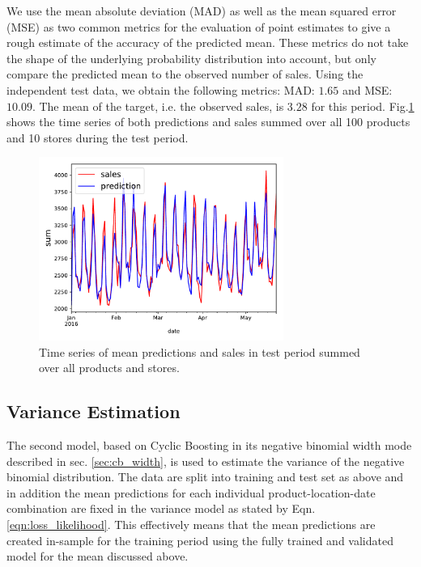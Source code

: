\documentclass[BCOR=1mm, DIV=calc,10pt,
twoside=true,
twocolumn,
headings=normal]{scrartcl}
\newcommand{\fig}{Fig.}
\newcommand{\eqn}{Eqn.}
\begin{document}
\noindent
We use the mean absolute deviation (MAD) as well as the mean squared error (MSE) as two common metrics for the evaluation of point estimates to give a rough estimate of the accuracy of the predicted mean. These metrics do not take the shape of the underlying probability distribution into account, but only compare the predicted mean to the observed number of sales. Using the independent test data, we obtain the following metrics: MAD: $1.65$ and MSE: $10.09$. The mean of the target, i.e. the observed sales, is $3.28$ for this period. \fig \ref{fig:mean_prediction} shows the time series of both predictions and sales summed over all 100 products and 10 stores during the test period.

\begin{figure}
\begin{center}
\includegraphics[width=8cm]{../figures/ts_full}
\caption{\label{fig:mean_prediction} Time series of mean predictions and sales in test period summed over all products and stores.}
\end{center}
\end{figure}

\subsection{Variance Estimation}

The second model, based on Cyclic Boosting in its negative binomial width mode described in sec. \ref{sec:cb_width}, is used to estimate the variance of the negative binomial distribution. The data are split into training and test set as above and in addition the mean predictions for each individual product-location-date combination are fixed in the variance model as stated by \eqn \eqref{eqn:loss_likelihood}. This effectively means that the mean predictions are created in-sample for the training period using the fully trained and validated model for the mean discussed above.
\end{document}
